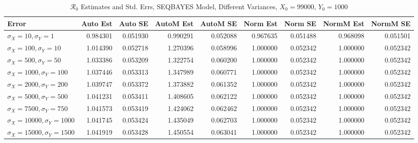 \documentclass[12pt]{article}
\newcommand{\rr}{\ensuremath{\mathcal{R}_0}}
\begin{document}
\begin{table}[H]
	
	\caption{$\rr$ Estimates and Std. Errs, SEQBAYES Model, 
		Different Variances, $X_0 = 99000$, $Y_0 = 1000$}
	\begin{footnotesize}
		\hskip -1.7cm
		\begin{tabular}{l|r|r|r|r|r|r|r|r}
			\hline
			Error & Auto Est & Auto SE & AutoM Est & AutoM SE & Norm Est & Norm SE & NormM Est & NormM SE\\
			\hline
			$\sigma_X = 10, \sigma_Y = 1$ & 0.984301 & 0.051930 & 0.990291 & 0.052088 & 0.967635 & 0.051488 & 0.968098 & 0.051501\\
			\hline
			$\sigma_X = 100, \sigma_Y = 10$ & 1.014390 & 0.052718 & 1.270396 & 0.058996 & 1.000000 & 0.052342 & 1.000000 & 0.052342\\
			\hline
			$\sigma_X = 500, \sigma_Y = 50$ & 1.033386 & 0.053209 & 1.322754 & 0.060200 & 1.000000 & 0.052342 & 1.000000 & 0.052342\\
			\hline
			$\sigma_X = 1000, \sigma_Y = 100$ & 1.037446 & 0.053313 & 1.347989 & 0.060771 & 1.000000 & 0.052342 & 1.000000 & 0.052342\\
			\hline
			$\sigma_X = 2000, \sigma_Y = 200$ & 1.039747 & 0.053372 & 1.373882 & 0.061352 & 1.000000 & 0.052342 & 1.000000 & 0.052342\\
			\hline
			$\sigma_X = 5000, \sigma_Y = 500$ & 1.041231 & 0.053411 & 1.408605 & 0.062122 & 1.000000 & 0.052342 & 1.000000 & 0.052342\\
			\hline
			$\sigma_X = 7500, \sigma_Y = 750$ & 1.041573 & 0.053419 & 1.424062 & 0.062462 & 1.000000 & 0.052342 & 1.000000 & 0.052342\\
			\hline
			$\sigma_X = 10000, \sigma_Y = 1000$ & 1.041745 & 0.053424 & 1.435049 & 0.062703 & 1.000000 & 0.052342 & 1.000000 & 0.052342\\
			\hline
			$\sigma_X = 15000, \sigma_Y = 1500$ & 1.041919 & 0.053428 & 1.450554 & 0.063041 & 1.000000 & 0.052342 & 1.000000 & 0.052342\\
			\hline
		\end{tabular}
	\end{footnotesize}
\end{table}
\end{document}

